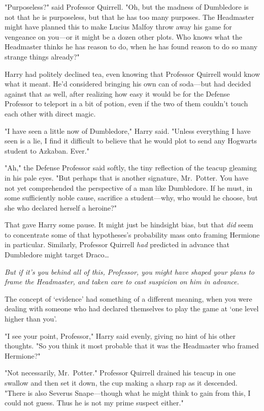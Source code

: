 "Purposeless?" said Professor Quirrell. "Oh, but the madness of Dumbledore is 
not that he is purposeless, but that he has too many purposes. The Headmaster 
might have planned this to make Lucius Malfoy throw away his game for vengeance 
on you---or it might be a dozen other plots. Who knows what the Headmaster 
thinks he has reason to do, when he has found reason to do so many strange 
things already?"

Harry had politely declined tea, even knowing that Professor Quirrell would 
know what it meant. He'd considered bringing his own can of soda---but had 
decided against that as well, after realizing how easy it would be for the 
Defense Professor to teleport in a bit of potion, even if the two of them 
couldn't touch each other with direct magic.

"I have seen a little now of Dumbledore," Harry said. "Unless everything I have 
seen is a lie, I find it difficult to believe that he would plot to send any 
Hogwarts student to Azkaban. Ever."

"Ah," the Defense Professor said softly, the tiny reflection of the teacup 
gleaming in his pale eyes. "But perhaps that is another signature, Mr.~Potter. 
You have not yet comprehended the perspective of a man like Dumbledore. If he 
must, in some sufficiently noble cause, sacrifice a student---why, who would he 
choose, but she who declared herself a heroine?"

That gave Harry some pause. It might just be hindsight bias, but that 
\emph{did} seem to concentrate some of that hypotheses's probability mass onto 
framing Hermione in particular. Similarly, Professor Quirrell \emph{had} 
predicted in advance that Dumbledore might target Draco{\ldots}

\emph{But if it's you behind all of this, Professor, you might have shaped your 
plans to frame the Headmaster, and taken care to cast suspicion on him in 
advance.}

The concept of `evidence' had something of a different meaning, when you were 
dealing with someone who had declared themselves to play the game at `one level 
higher than you'.

"I see your point, Professor," Harry said evenly, giving no hint of his other 
thoughts. "So you think it most probable that it was the Headmaster who framed 
Hermione?"

"Not necessarily, Mr.~Potter." Professor Quirrell drained his teacup in one 
swallow and then set it down, the cup making a sharp rap as it descended. 
"There is also Severus Snape---though what he might think to gain from this, I 
could not guess. Thus he is not my prime suspect either."

